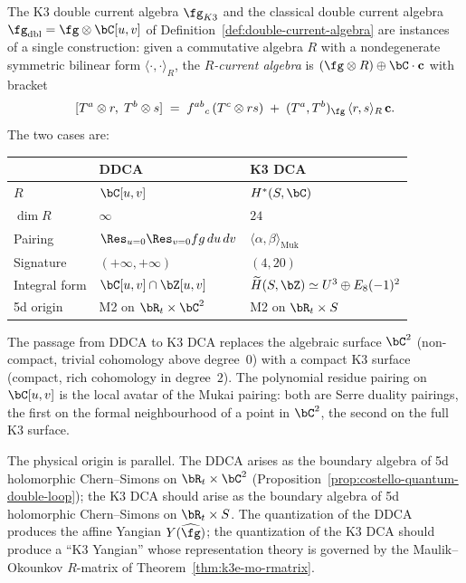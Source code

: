 \begin{remark}
\label{rem:k3-dca-vs-ddca}
The K3 double current algebra $\fg_{K3}$ and the classical double
current algebra $\fg_{\mathrm{dbl}} = \fg \otimes \bC[u,v]$ of
Definition~\ref{def:double-current-algebra} are instances of a
single construction: given a commutative algebra $R$ with a
nondegenerate symmetric bilinear form $\langle\cdot,\cdot\rangle_R$,
the \emph{$R$-current algebra} is $(\fg \otimes R) \oplus \bC \cdot \mathbf{c}$
with bracket
\[
  [T^a \otimes r,\; T^b \otimes s]
  \;=\;
  f^{ab}{}_{c}\,(T^c \otimes rs)
  \;+\;
  (T^a, T^b)_{\fg}\,\langle r, s \rangle_R \, \mathbf{c}.
\]
The two cases are:
\begin{center}
\renewcommand{\arraystretch}{1.3}
\begin{tabular}{lll}
 \toprule
 & \textbf{DDCA} & \textbf{K3 DCA} \\
 \midrule
 $R$ & $\bC[u,v]$ & $H^*(S, \bC)$ \\
 $\dim R$ & $\infty$ & $24$ \\
 Pairing & $\Res_{u=0}\Res_{v=0} fg\,du\,dv$ & $\langle \alpha, \beta \rangle_{\mathrm{Muk}}$ \\
 Signature & $(+\infty, +\infty)$ & $(4, 20)$ \\
 Integral form & $\bC[u,v] \cap \bZ[u,v]$ & $\widetilde{H}(S, \bZ) \simeq U^3 \oplus E_8(-1)^2$ \\
 5d origin & M2 on $\bR_t \times \bC^2$ & M2 on $\bR_t \times S$ \\
 \bottomrule
\end{tabular}
\end{center}
The passage from DDCA to K3 DCA replaces the algebraic surface
$\bC^2$ (non-compact, trivial cohomology above degree~$0$) with
a compact K3 surface (compact, rich cohomology in degree~$2$).
The polynomial residue pairing on $\bC[u,v]$ is the local avatar
of the Mukai pairing: both are Serre duality pairings, the first
on the formal neighbourhood of a point in $\bC^2$, the second
on the full K3 surface.

The physical origin is parallel. The DDCA arises as the boundary
algebra of 5d holomorphic Chern--Simons on $\bR_t \times \bC^2$
(Proposition~\ref{prop:costello-quantum-double-loop}); the K3 DCA
should arise as the boundary algebra of 5d holomorphic Chern--Simons
on $\bR_t \times S$. The quantization of the DDCA produces the
affine Yangian $Y(\widehat{\fg})$; the quantization of the K3 DCA
should produce a ``K3 Yangian'' whose representation theory is
governed by the Maulik--Okounkov $R$-matrix of
Theorem~\ref{thm:k3e-mo-rmatrix}.
\end{remark}


